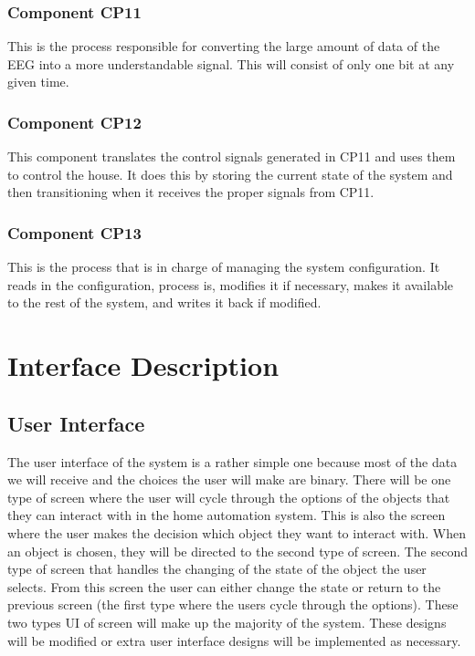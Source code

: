 \documentclass{article}
\begin{document}
\subsubsection{Component CP11}
This is the process responsible for converting the large amount of data of the EEG into a more understandable signal. This will consist of only one bit at any given time.

\subsubsection{Component CP12}
This component translates the control signals generated in CP11 and uses them to control the house. It does this by storing the current state of the system and then transitioning when it receives the proper signals from CP11.

\subsubsection{Component CP13}
This is the process that is in charge of managing the system configuration. It reads in the configuration, process is, modifies it if necessary, makes it available to the rest of the system, and writes it back if modified.


\newpage

\section{Interface Description}

\subsection{User Interface}



The user interface of the system is a rather simple one because most of the data we will receive and the choices the user will make are binary. There will be one type of screen where the user will cycle through the options of the objects that they can interact with in the home automation system. This is also the screen where the user makes the decision which object they want to interact with. When an object is chosen, they will be directed to the second type of screen. The second type of screen that handles the changing of the state of the object the user selects. From this screen the user can either change the state or return to the previous screen (the first type where the users cycle through the options). These two types UI of screen will make up the majority of the system. These designs will be modified or extra user interface designs will be implemented as necessary. 
\end{document}
